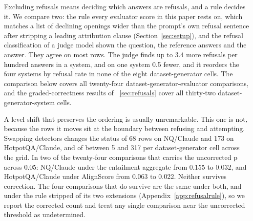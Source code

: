 \label{sec:graders}

Excluding refusals means deciding which answers are refusals, and a rule decides it. We compare two: the rule every evaluator score in this paper rests on, which matches a list of declining openings wider than the prompt's own refusal sentence after stripping a leading attribution clause (Section~\ref{sec:setup}), and the refusal classification of a judge model shown the question, the reference answers and the answer. They agree on most rows. The judge finds up to 3.4 more refusals per hundred answers in a system, and on one system 0.5 fewer, and it reorders the four systems by refusal rate in none of the eight dataset-generator cells. The comparison below covers all twenty-four dataset-generator-evaluator comparisons, and the graded-correctness results of \movedref~\ref{sec:refusals} cover all thirty-two dataset-generator-system cells.

A level shift that preserves the ordering is usually unremarkable. This one is not, because the rows it moves sit at the boundary between refusing and attempting. Swapping detectors changes the status of 68 rows on NQ/Claude and 173 on HotpotQA/Claude, and of between 5 and 317 per dataset-generator cell across the grid. In two of the twenty-four comparisons that carries the uncorrected p across 0.05: NQ/Claude under the entailment aggregate from 0.155 to 0.032, and HotpotQA/Claude under AlignScore from 0.063 to 0.022. Neither survives correction. The four comparisons that do survive are the same under both, and under the rule stripped of its two extensions (Appendix~\ref{app:refusalrule}), so we report the corrected count and treat any single comparison near the uncorrected threshold as undetermined.
